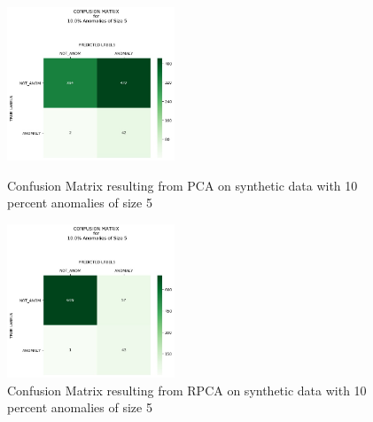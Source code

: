 \documentclass[conference]{IEEEtran}
\begin{document}
\begin{figure}[H]
\begin{minipage}[b]{0.45\linewidth}
    \centering

    \includegraphics[width=50mm, scale=0.5]{cmPCATest_400AnomSize5.jpg}
    \caption{Confusion Matrix resulting from PCA on synthetic data with 10 percent anomalies of size 5}
    \label{fig::CMtrainPCA4005}
\end{minipage}
\quad
\begin{minipage}[b]{0.45\linewidth}
    \centering
    \includegraphics[width=50mm, scale=0.5]{cmRPCATest_400AnomSize5.jpg}
    \caption{Confusion Matrix resulting from RPCA on synthetic data with 10 percent anomalies of size 5}
    \label{fig::CMtrainRPCA4005}
\end{minipage}
\end{figure}

\end{document}
